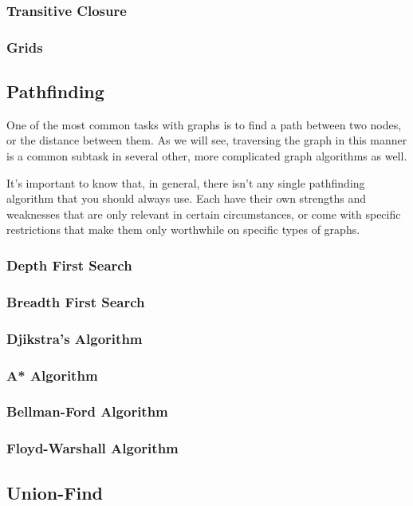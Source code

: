 \subsubsection{Transitive Closure}
\subsubsection{Grids}
\subsection{Pathfinding}

One of the most common tasks with graphs is to find a path between two nodes, or the distance between them. As we will see, traversing the graph in this manner is a common subtask in several other, more complicated graph algorithms as well.

It's important to know that, in general, there isn't any single pathfinding algorithm that you should always use. Each have their own strengths and weaknesses that are only relevant in certain circumstances, or come with specific restrictions that make them only worthwhile on specific types of graphs.

\subsubsection{Depth First Search}
\subsubsection{Breadth First Search}
\subsubsection{Djikstra's Algorithm}
\subsubsection{A* Algorithm}
\subsubsection{Bellman-Ford Algorithm}
\subsubsection{Floyd-Warshall Algorithm}
\subsection{Union-Find}

